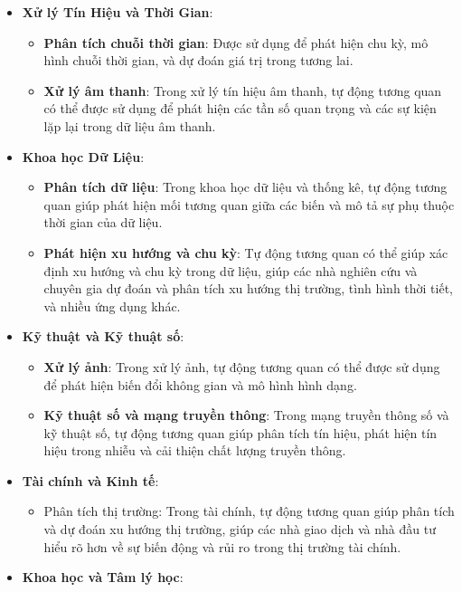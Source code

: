 \documentclass[
]{book}
\providecommand{\tightlist}{%
  \setlength{\itemsep}{0pt}\setlength{\parskip}{0pt}}
\begin{document}
\begin{itemize}
\tightlist
\item
  \textbf{Xử lý Tín Hiệu và Thời Gian}:

  \begin{itemize}
  \tightlist
  \item
    \textbf{Phân tích chuỗi thời gian}: Được sử dụng để phát hiện chu kỳ, mô hình chuỗi thời gian, và dự đoán giá trị trong tương lai.
  \item
    \textbf{Xử lý âm thanh}: Trong xử lý tín hiệu âm thanh, tự động tương quan có thể được sử dụng để phát hiện các tần số quan trọng và các sự kiện lặp lại trong dữ liệu âm thanh.
  \end{itemize}
\item
  \textbf{Khoa học Dữ Liệu}:

  \begin{itemize}
  \tightlist
  \item
    \textbf{Phân tích dữ liệu}: Trong khoa học dữ liệu và thống kê, tự động tương quan giúp phát hiện mối tương quan giữa các biến và mô tả sự phụ thuộc thời gian của dữ liệu.
  \item
    \textbf{Phát hiện xu hướng và chu kỳ}: Tự động tương quan có thể giúp xác định xu hướng và chu kỳ trong dữ liệu, giúp các nhà nghiên cứu và chuyên gia dự đoán và phân tích xu hướng thị trường, tình hình thời tiết, và nhiều ứng dụng khác.
  \end{itemize}
\item
  \textbf{Kỹ thuật và Kỹ thuật số}:

  \begin{itemize}
  \tightlist
  \item
    \textbf{Xử lý ảnh}: Trong xử lý ảnh, tự động tương quan có thể được sử dụng để phát hiện biến đổi không gian và mô hình hình dạng.
  \item
    \textbf{Kỹ thuật số và mạng truyền thông}: Trong mạng truyền thông số và kỹ thuật số, tự động tương quan giúp phân tích tín hiệu, phát hiện tín hiệu trong nhiễu và cải thiện chất lượng truyền thông.
  \end{itemize}
\item
  \textbf{Tài chính và Kinh tế}:

  \begin{itemize}
  \tightlist
  \item
    Phân tích thị trường: Trong tài chính, tự động tương quan giúp phân tích và dự đoán xu hướng thị trường, giúp các nhà giao dịch và nhà đầu tư hiểu rõ hơn về sự biến động và rủi ro trong thị trường tài chính.
  \end{itemize}
\item
  \textbf{Khoa học và Tâm lý học}:


\end{itemize}
\end{document}
